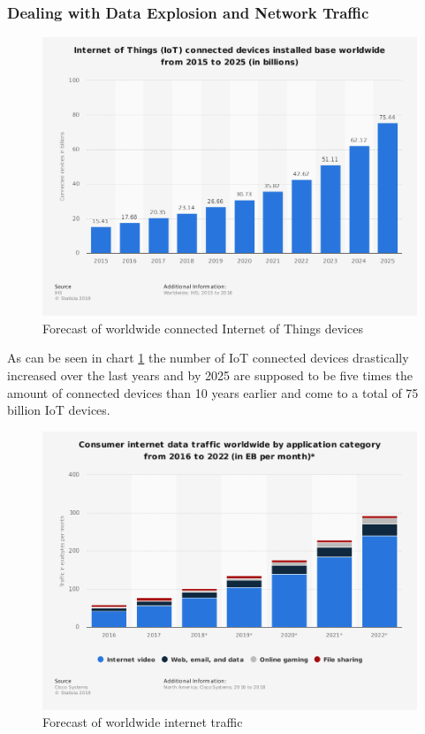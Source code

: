 \subsubsection{Dealing with Data Explosion and Network Traffic}\hspace*{\fill} \begin{figure}[H]
    \centering
    \includegraphics[width=1\textwidth]{resources/images/global_iot_devices.png}
    \caption{Forecast of worldwide connected Internet of Things devices}
    \label{fig:global_iot_devices}
\end{figure}

As can be seen in chart \ref{fig:global_iot_devices} the number of IoT connected devices drastically increased over the last years and by 2025 are supposed to be five times the amount of connected devices than 10 years earlier and come to a total of 75 billion IoT devices.

\begin{figure}[H]
    \centering
    \includegraphics[width=1\textwidth]{resources/images/global_traffic.png}
    \caption{Forecast of worldwide internet traffic}
    \label{fig:global_traffic}
\end{figure}

